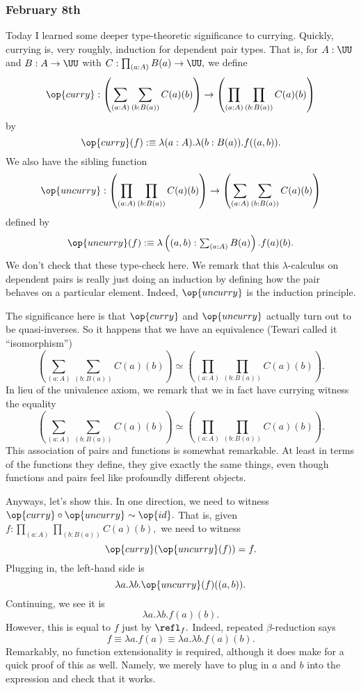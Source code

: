 \subsubsection{February 8th}
Today I learned some deeper type-theoretic significance to currying. Quickly, currying is, very roughly, induction for dependent pair types. That is, for $A:\UU$ and $B:A\to\UU$ with $C:\prod_{(a:A)}B(a)\to\UU,$ we define
\[\op{curry}:\left(\sum_{(a:A)}\sum_{(b:B(a))}C(a)(b)\right)\to\left(\prod_{(a:A)}\prod_{(b:B(a))}C(a)(b)\right)\]
by
\[\op{curry}(f):\equiv\lambda(a:A).\lambda(b:B(a)).f((a,b)).\]
We also have the sibling function
\[\op{uncurry}:\left(\prod_{(a:A)}\prod_{(b:B(a))}C(a)(b)\right)\to\left(\sum_{(a:A)}\sum_{(b:B(a))}C(a)(b)\right)\]
defined by
\[\op{uncurry}(f):\equiv\lambda\left((a,b):\textstyle\sum_{(a:A)}B(a)\right).f(a)(b).\]
We don't check that these type-check here. We remark that this $\lambda$-calculus on dependent pairs is really just doing an induction by defining how the pair behaves on a particular element. Indeed, $\op{uncurry}$ is the induction principle.

The significance here is that $\op{curry}$ and $\op{uncurry}$ actually turn out to be quasi-inverses. So it happens that we have an equivalence (Tewari called it ``isomorphism'')
\[\left(\sum_{(a:A)}\sum_{(b:B(a))}C(a)(b)\right)\simeq\left(\prod_{(a:A)}\prod_{(b:B(a))}C(a)(b)\right).\]
In lieu of the univalence axiom, we remark that we in fact have currying witness the equality
\[\left(\sum_{(a:A)}\sum_{(b:B(a))}C(a)(b)\right)\simeq\left(\prod_{(a:A)}\prod_{(b:B(a))}C(a)(b)\right).\]
This association of pairs and functions is somewhat remarkable. At least in terms of the functions they define, they give exactly the same things, even though functions and pairs feel like profoundly different objects.

Anyways, let's show this. In one direction, we need to witness $\op{curry}\circ\op{uncurry}\sim\op{id}.$ That is, given $f:\prod_{(a:A)}\prod_{(b:B(a))}C(a)(b),$ we need to witness
\[\op{curry}(\op{uncurry}(f))=f.\]
Plugging in, the left-hand side is
\[\lambda a.\lambda b.\op{uncurry}(f)((a,b)).\]
Continuing, we see it is
\[\lambda a.\lambda b.f(a)(b).\]
However, this is equal to $f$ just by $\refl_f.$ Indeed, repeated $\beta$-reduction says
\[f\equiv\lambda a.f(a)\equiv\lambda a.\lambda b.f(a)(b).\]
Remarkably, no function extensionality is required, although it does make for a quick proof of this as well. Namely, we merely have to plug in $a$ and $b$ into the expression and check that it works.

